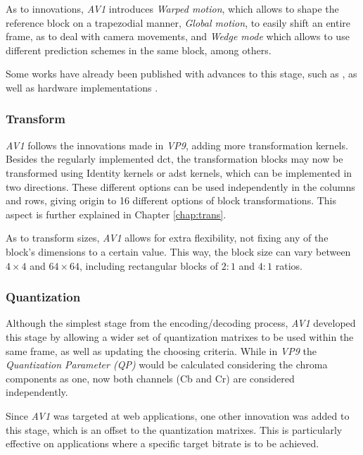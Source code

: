 As to innovations, \emph{AV1} introduces \emph{Warped motion}, which allows to shape the reference block on a trapezodial manner, \emph{Global motion}, to easily shift an entire frame, as to deal with camera movements, and \emph{Wedge mode} which allows to use different prediction schemes in the same block, among others.

Some works have already been published with advances to this stage, such as \cite{dengHardwarefriendlyInterPrediction2017}, as well as hardware implementations \cite{domanskiHighThroughputMultifilterInterpolation2019}.

\subsubsection{Transform}

\emph{AV1} follows the innovations made in \emph{VP9}, adding more transformation kernels. Besides the regularly implemented \gls{dct}, the transformation blocks may now be transformed using Identity kernels or \gls{adst} kernels, which can be implemented in two directions. These different options can be used independently in the columns and rows, giving origin to 16 different options of block transformations. This aspect is further explained in Chapter \ref{chap:trans}.

As to transform sizes, \emph{AV1} allows for extra flexibility, not fixing any of the block's dimensions to a certain value. This way, the block size can vary between $4 \times 4$ and $64 \times 64$, including rectangular blocks of $2:1$ and $4:1$ ratios.

\subsubsection{Quantization}

Although the simplest stage from the encoding/decoding process, \emph{AV1} developed this stage by allowing a wider set of quantization matrixes to be used within the same frame, as well as updating the choosing criteria. While in \emph{VP9} the \emph{Quantization Parameter (QP)} would be calculated considering the chroma components as one, now both channels (Cb and Cr) are considered independently.

Since \emph{AV1} was targeted at web applications, one other innovation was added to this stage, which is an offset to the quantization matrixes. This is particularly effective on applications where a specific target bitrate is to be achieved.


